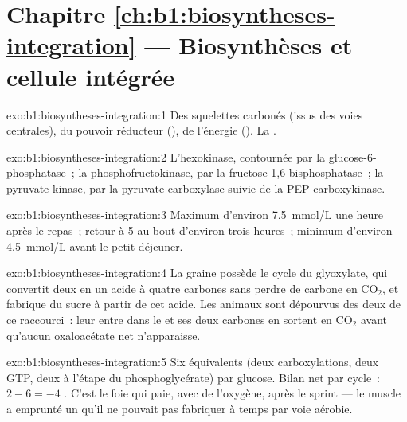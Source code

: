 \section*{Chapitre \ref{ch:b1:biosyntheses-integration} --- Biosynthèses et cellule intégrée}

\begin{solution}{exo:b1:biosyntheses-integration:1}
Des squelettes carbonés (issus des voies centrales), du pouvoir
réducteur (), de l'énergie (). La .
\end{solution}

\begin{solution}{exo:b1:biosyntheses-integration:2}
L'hexokinase, contournée par la glucose-6-phosphatase~; la
phosphofructokinase, par la fructose-1,6-bisphosphatase~; la pyruvate
kinase, par la pyruvate carboxylase suivie de la PEP carboxykinase.
\end{solution}

\begin{solution}{exo:b1:biosyntheses-integration:3}
Maximum d'environ \qty{7.5}{mmol/L} une heure après le repas~; retour à
\qty{5}{} au bout d'environ trois heures~; minimum d'environ
\qty{4.5}{mmol/L} avant le petit déjeuner.
\end{solution}

\begin{solution}{exo:b1:biosyntheses-integration:4}
La graine possède le cycle du glyoxylate, qui convertit deux 
en un acide à quatre carbones sans perdre de carbone en
$\mathrm{CO_2}$, et fabrique du sucre à partir de cet acide. Les animaux
sont dépourvus des deux  de ce raccourci~: leur  entre
dans le  et ses deux carbones en sortent en
$\mathrm{CO_2}$ avant qu'aucun oxaloacétate net n'apparaisse.
\end{solution}

\begin{solution}{exo:b1:biosyntheses-integration:5}
Six équivalents  (deux carboxylations, deux GTP, deux  à l'étape
du phosphoglycérate) par glucose. Bilan net par cycle~: $2 - 6 = -4$
. C'est le foie qui paie, avec de l'oxygène, après le sprint --- le
muscle a emprunté un  qu'il ne pouvait pas fabriquer à temps par voie
aérobie.
\end{solution}

